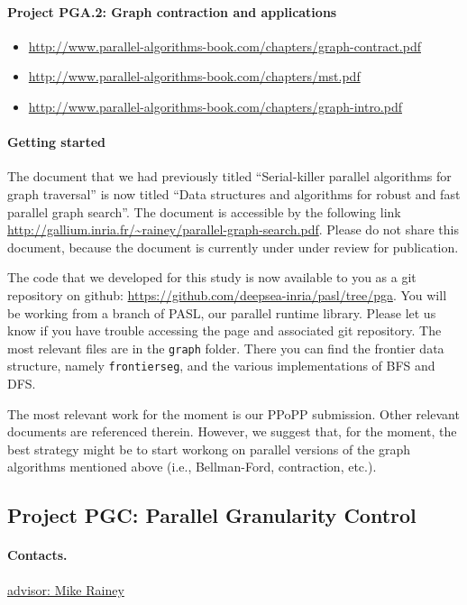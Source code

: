 \documentclass[11pt]{article}
\newcommand{\email}[2]{\href{mailto:#2}{#1}}
\begin{document}
\paragraph{Project PGA.2: Graph contraction and applications}
\begin{itemize}
\item 
\url{http://www.parallel-algorithms-book.com/chapters/graph-contract.pdf}

\item 
\url{http://www.parallel-algorithms-book.com/chapters/mst.pdf}

\item 
\url{http://www.parallel-algorithms-book.com/chapters/graph-intro.pdf}
\end{itemize}

\paragraph{Getting started}
The document that we had previously titled ``Serial-killer parallel
algorithms for graph traversal'' is now titled ``Data structures and
algorithms for robust and fast parallel graph search''. The document
is accessible by the following link
\url{http://gallium.inria.fr/~rainey/parallel-graph-search.pdf}.
Please do not share this document, because the document is currently
under under review for publication.

The code that we developed for this study is now available to you as a
git repository on github:
\url{https://github.com/deepsea-inria/pasl/tree/pga}.  You will be
working from a branch of PASL, our parallel runtime library.  Please
let us know if you have trouble accessing the page and associated git
repository. The most relevant files are in the \texttt{graph} folder.
There you can find the frontier data structure, namely
\texttt{frontierseg}, and the various implementations of BFS and DFS.

The most relevant work for the moment is our PPoPP submission. Other
relevant documents are referenced therein. However, we suggest that,
for the moment, the best strategy might be to start workong on
parallel versions of the graph algorithms mentioned above (i.e.,
Bellman-Ford, contraction, etc.).

\subsection{Project PGC: Parallel Granularity Control}

\paragraph{Contacts.}
\email{advisor: Mike Rainey}{mike.rainey@infria.fr}
\end{document}
